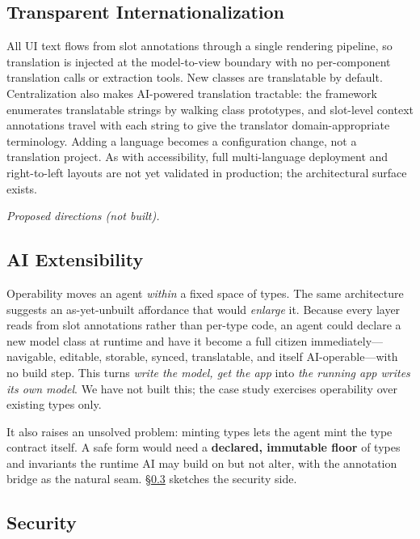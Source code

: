 \documentclass[sigplan,review,anonymous,10pt]{acmart}
\begin{document}
\subsection{Transparent Internationalization}
\label{sec:i18n}

All UI text flows from slot annotations through a single rendering pipeline, so translation is injected at the model-to-view boundary with no per-component translation calls or extraction tools. New classes are translatable by default. Centralization also makes AI-powered translation tractable: the framework enumerates translatable strings by walking class prototypes, and slot-level context annotations travel with each string to give the translator domain-appropriate terminology. Adding a language becomes a configuration change, not a translation project. As with accessibility, full multi-language deployment and right-to-left layouts are not yet validated in production; the architectural surface exists.

\medskip\noindent\textit{Proposed directions (not built).}

\subsection{AI Extensibility}
\label{sec:ai-extensibility}

Operability moves an agent \emph{within} a fixed space of types. The same architecture suggests an as-yet-unbuilt affordance that would \emph{enlarge} it. Because every layer reads from slot annotations rather than per-type code, an agent could declare a new model class at runtime and have it become a full citizen immediately---navigable, editable, storable, synced, translatable, and itself AI-operable---with no build step. This turns \emph{write the model, get the app} into \emph{the running app writes its own model}. We have not built this; the case study exercises operability over existing types only.

It also raises an unsolved problem: minting types lets the agent mint the type contract itself. A safe form would need a \textbf{declared, immutable floor} of types and invariants the runtime AI may build on but not alter, with the annotation bridge as the natural seam. \S\ref{sec:security} sketches the security side.

\subsection{Security}
\label{sec:security}
\end{document}
